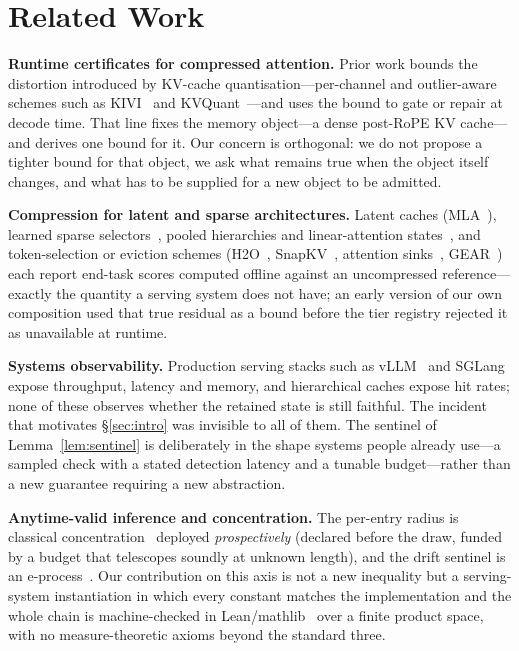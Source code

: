 \documentclass[11pt]{article}
\begin{document}
\section{Related Work}
\label{sec:related}
\textbf{Runtime certificates for compressed attention.} Prior work bounds the
distortion introduced by KV-cache quantisation---per-channel and outlier-aware
schemes such as KIVI~\cite{kivi} and KVQuant~\cite{kvquant}---and uses the bound
to gate or repair at decode time. That line fixes the memory object---a dense post-RoPE KV cache---and
derives one bound for it. Our concern is orthogonal: we do not propose a tighter
bound for that object, we ask what remains true when the object itself changes, and
what has to be supplied for a new object to be admitted.

\textbf{Compression for latent and sparse architectures.} Latent caches
(MLA~\cite{deepseekv2}), learned sparse selectors~\cite{nsa}, pooled
hierarchies and linear-attention states~\cite{gla}, and token-selection or
eviction schemes (H2O~\cite{h2o}, SnapKV~\cite{snapkv}, attention
sinks~\cite{streamingllm}, GEAR~\cite{gear}) each report end-task scores
computed offline against an uncompressed reference---exactly the quantity a
serving system does not have; an early version of our own composition used
that true residual as a bound before the tier registry rejected it as
unavailable at runtime.

\textbf{Systems observability.} Production serving stacks such as
vLLM~\cite{vllm} and SGLang~\cite{sglang} expose throughput, latency and memory,
and hierarchical caches expose hit rates; none of these observes whether
the retained state is still faithful. The incident that motivates
\S\ref{sec:intro} was invisible to all of them. The sentinel of
Lemma~\ref{lem:sentinel} is deliberately in the shape systems people already
use---a sampled check with a stated detection latency and a tunable budget---rather
than a new guarantee requiring a new abstraction.

\textbf{Anytime-valid inference and concentration.} The per-entry radius is
classical concentration~\cite{hoeffding,mcdiarmid} deployed
\emph{prospectively} (declared before the draw, funded by a budget that
telescopes soundly at unknown length), and the drift sentinel is an
e-process~\cite{ramdas-savi,ville,howard-chernoff}. Our contribution on
this axis is not a new inequality but a serving-system instantiation in
which every constant matches the implementation and the whole chain is
machine-checked in Lean/mathlib~\cite{mathlib} over a finite product
space, with no measure-theoretic axioms beyond the standard three.
\end{document}
